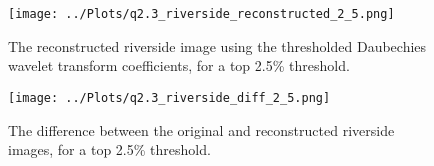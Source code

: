 \documentclass[12pt]{report} %
\begin{document}
\begin{figure}[htbp]
    \centering
    \texttt{[image: ../Plots/q2.3\_riverside\_reconstructed\_2\_5.png]}
    \caption{The reconstructed riverside image using the thresholded Daubechies wavelet transform coefficients, for a top 2.5\% threshold.}
    \label{fig:reconstructed_image2.5}
\end{figure}

\begin{figure}[htbp]
    \centering
    \texttt{[image: ../Plots/q2.3\_riverside\_diff\_2\_5.png]}
    \caption{The difference between the original and reconstructed riverside images, for a top 2.5\% threshold.}
    \label{fig:diff_image2.5}
\end{figure}





\end{document}
